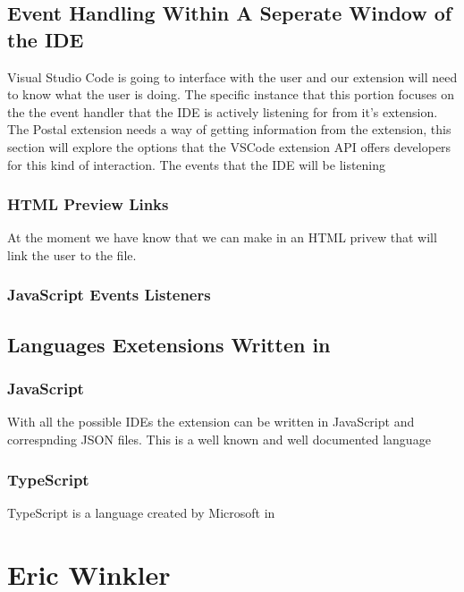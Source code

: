 \documentclass[letterpaper,10pt,titlepage,draftclsnofoot,onecolumn,onesided] {IEEEtran}
\begin{document}
%
\subsection{Event Handling Within A Seperate Window of the IDE}
Visual Studio Code is going to interface with the user and our extension will need to know what the user is doing.
The specific instance that this portion focuses on the the event handler that the IDE is actively listening for from it's extension.
The Postal extension needs a way of getting information from the extension, this section will explore the options that the VSCode extension API offers developers for this kind of interaction. 
The events that the IDE will be listening 

\subsubsection{HTML Preview Links}
At the moment we have know that we can make in an HTML privew that will link the user to the file. 
\subsubsection{JavaScript Events Listeners}

\subsection{Languages Exetensions Written in}
\subsubsection{JavaScript}
With all the possible IDEs the extension can be written in JavaScript and correspnding JSON files. 
This is a well known and well documented language 
\subsubsection{TypeScript}
TypeScript is a language created by Microsoft in 


\section{Eric Winkler}
\end{document}
